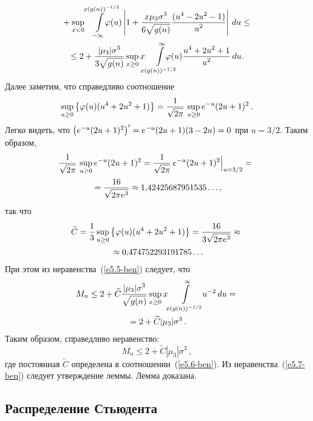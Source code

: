 \begin{multicols}{2}
\noindent
\begin{multline}
{}+ \sup\limits_{x<0} \!\!\!\int\limits_{-\infty}^{x(g(n))^{-1/2}} \!\!\!\!\!\!\!\!\!\!\varphi(u)
\left|1 + \fr{x\mu_3\sigma^3}{6
\sqrt{g(n)}}\fr{(u^4-2u^2-1)}{u^2}\right|\, du \le{}\hspace*{-0.40298pt}
\\
\hspace*{-1.8mm}{}\le 2 + \fr{|\mu_3|\sigma^3}{3\sqrt{g(n)}} \sup\limits_{x\ge0} x
\!\!\!\int\limits_{x(g(n))^{-1/2}}^\infty\!\!\!\!\!\!\!\!\!\!\varphi(u)
\fr{u^4+2u^2+1}{u^2} \,du.\!\!\label{e5.5-ben}
\end{multline}
Далее заметим, что справедливо соотношение
$$
\sup\limits_{u\ge0}
\left\{\varphi(u)(u^4+2u^2+1)\right\}=\displaystyle\frac{\displaystyle 1\mathstrut}{\displaystyle \sqrt{2\pi}\mathstrut}\,\sup\limits_{u\ge0}e^{-u}(2u+1)^2\,.
$$
Легко видеть, что $\left(e^{-u}(2u+1)^2\right)^\prime\hm=e^{-u}(2u\hm+1)(3\hm-2u)\hm=0$
при $u={3}/{2}$. Таким образом,
\begin{multline*}
\hspace*{-1.36589pt}\displaystyle\frac{\displaystyle 1\mathstrut}{\displaystyle \sqrt{2\pi}\mathstrut}\,\sup\limits_{u\ge0}e^{-u}(2u+1)^2
=\displaystyle\frac{\displaystyle 1\mathstrut}{\displaystyle \sqrt{2\pi}\mathstrut}\,e^{-u}(2u+1)^2\Big|_{u=3/2}={}\\
{}=\displaystyle\frac{\displaystyle 16\mathstrut}{\displaystyle \sqrt{2\pi
e^3}\mathstrut}\approx 1{,}42425687951535\ldots ,
\end{multline*}
так что
\begin{multline}
\widetilde C=\displaystyle\frac{\displaystyle 1\mathstrut}{\displaystyle 3\mathstrut}\sup\limits_{u\ge0}
\left\{\varphi(u)(u^4+2u^2+1)\right\}=\displaystyle\frac{\displaystyle 16\mathstrut}{\displaystyle 3\sqrt{2\pi
e^3}\mathstrut}\approx{}\\
{}\approx 0{,}474752293191785\ldots 
\label{e5.6-ben}
\end{multline}
При этом из неравенства~(\ref{e5.5-ben}) следует, что
\begin{multline*}
M_n \le 2 + \widetilde C \displaystyle\frac{\displaystyle |\mu_3|\sigma^3\mathstrut}{\displaystyle \sqrt{g(n)}\mathstrut}
\sup\limits_{x\ge0} x \!\int\limits_{x(g(n))^{-1/2}}^\infty \!\!u^{-2}\, du
={}\\
{}= 2 + \widetilde C|\mu_3|\sigma^3\,.
\end{multline*}
Таким образом, справедливо неравенство:
\begin{equation}
M_n \le  2 + \widetilde C|\mu_3|\sigma^3\,,\label{e5.7-ben}
\end{equation}
где постоянная $\widetilde C$ определена в соотношении~(\ref{e5.6-ben}). Из
неравенства~(\ref{e5.7-ben}) следует утверждение леммы. Лемма доказана.

\subsection{Распределение Стьюдента}


\end{multicols}
